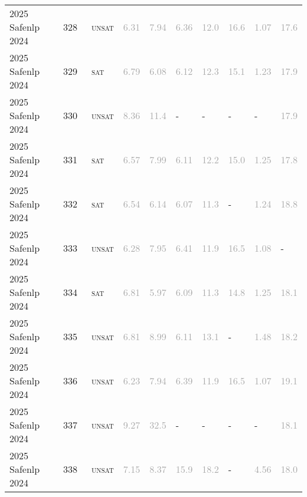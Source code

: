 \begin{center}
{\begin{longtable}{@{}llllllllll@{}}
2025 Safenlp 2024 & 328 & ~\textsc{unsat} & \textcolor{darkgray}{6.31} & \textcolor{darkgray}{7.94} & \textcolor{darkgray}{6.36} & \textcolor{darkgray}{12.0} & \textcolor{darkgray}{16.6} & \textcolor{darkgray}{1.07} & \textcolor{darkgray}{17.6} \\
2025 Safenlp 2024 & 329 & ~\textsc{sat} & \textcolor{darkgray}{6.79} & \textcolor{darkgray}{6.08} & \textcolor{darkgray}{6.12} & \textcolor{darkgray}{12.3} & \textcolor{darkgray}{15.1} & \textcolor{darkgray}{1.23} & \textcolor{darkgray}{17.9} \\
2025 Safenlp 2024 & 330 & ~\textsc{unsat} & \textcolor{darkgray}{8.36} & \textcolor{darkgray}{11.4} & - & - & - & - & \textcolor{darkgray}{17.9} \\
2025 Safenlp 2024 & 331 & ~\textsc{sat} & \textcolor{darkgray}{6.57} & \textcolor{darkgray}{7.99} & \textcolor{darkgray}{6.11} & \textcolor{darkgray}{12.2} & \textcolor{darkgray}{15.0} & \textcolor{darkgray}{1.25} & \textcolor{darkgray}{17.8} \\
2025 Safenlp 2024 & 332 & ~\textsc{sat} & \textcolor{darkgray}{6.54} & \textcolor{darkgray}{6.14} & \textcolor{darkgray}{6.07} & \textcolor{darkgray}{11.3} & - & \textcolor{darkgray}{1.24} & \textcolor{darkgray}{18.8} \\
2025 Safenlp 2024 & 333 & ~\textsc{unsat} & \textcolor{darkgray}{6.28} & \textcolor{darkgray}{7.95} & \textcolor{darkgray}{6.41} & \textcolor{darkgray}{11.9} & \textcolor{darkgray}{16.5} & \textcolor{darkgray}{1.08} & - \\
2025 Safenlp 2024 & 334 & ~\textsc{sat} & \textcolor{darkgray}{6.81} & \textcolor{darkgray}{5.97} & \textcolor{darkgray}{6.09} & \textcolor{darkgray}{11.3} & \textcolor{darkgray}{14.8} & \textcolor{darkgray}{1.25} & \textcolor{darkgray}{18.1} \\
2025 Safenlp 2024 & 335 & ~\textsc{unsat} & \textcolor{darkgray}{6.81} & \textcolor{darkgray}{8.99} & \textcolor{darkgray}{6.11} & \textcolor{darkgray}{13.1} & - & \textcolor{darkgray}{1.48} & \textcolor{darkgray}{18.2} \\
2025 Safenlp 2024 & 336 & ~\textsc{unsat} & \textcolor{darkgray}{6.23} & \textcolor{darkgray}{7.94} & \textcolor{darkgray}{6.39} & \textcolor{darkgray}{11.9} & \textcolor{darkgray}{16.5} & \textcolor{darkgray}{1.07} & \textcolor{darkgray}{19.1} \\
2025 Safenlp 2024 & 337 & ~\textsc{unsat} & \textcolor{darkgray}{9.27} & \textcolor{darkgray}{32.5} & - & - & - & - & \textcolor{darkgray}{18.1} \\
2025 Safenlp 2024 & 338 & ~\textsc{unsat} & \textcolor{darkgray}{7.15} & \textcolor{darkgray}{8.37} & \textcolor{darkgray}{15.9} & \textcolor{darkgray}{18.2} & - & \textcolor{darkgray}{4.56} & \textcolor{darkgray}{18.0} \\

\end{longtable}}
\end{center}
